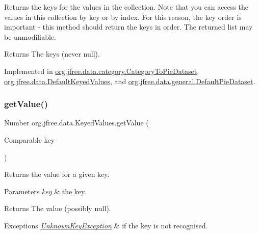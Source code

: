 Returns the keys for the values in the collection. Note that you can access the values in this collection by key or by index. For this reason, the key order is important -\/ this method should return the keys in order. The returned list may be unmodifiable.

\begin{DoxyReturn}{Returns}
The keys (never {\ttfamily null}). 
\end{DoxyReturn}


Implemented in \mbox{\hyperlink{classorg_1_1jfree_1_1data_1_1category_1_1_category_to_pie_dataset_aa8974b76f827b4dc093f0d6b66752c1c}{org.\+jfree.\+data.\+category.\+Category\+To\+Pie\+Dataset}}, \mbox{\hyperlink{classorg_1_1jfree_1_1data_1_1_default_keyed_values_ad6896bc409fc73cbdf59a50ac427d261}{org.\+jfree.\+data.\+Default\+Keyed\+Values}}, and \mbox{\hyperlink{classorg_1_1jfree_1_1data_1_1general_1_1_default_pie_dataset_a4e5eb908e2e2005625ff71f85ebad97a}{org.\+jfree.\+data.\+general.\+Default\+Pie\+Dataset}}.

\mbox{\label{interfaceorg_1_1jfree_1_1data_1_1_keyed_values_aa6bb7fe3ff33503d7f31b9be505c3a70}} 
\subsubsection{\texorpdfstring{get\+Value()}{getValue()}}
{\footnotesize\ttfamily Number org.\+jfree.\+data.\+Keyed\+Values.\+get\+Value (\begin{DoxyParamCaption}\item[{Comparable}]{key }\end{DoxyParamCaption})}

Returns the value for a given key.


\begin{DoxyParams}{Parameters}
{\em key} & the key.\\
\hline
\end{DoxyParams}
\begin{DoxyReturn}{Returns}
The value (possibly {\ttfamily null}).
\end{DoxyReturn}

\begin{DoxyExceptions}{Exceptions}
{\em \mbox{\hyperlink{classorg_1_1jfree_1_1data_1_1_unknown_key_exception}{Unknown\+Key\+Exception}}} & if the key is not recognised. \\
\hline
\end{DoxyExceptions}


